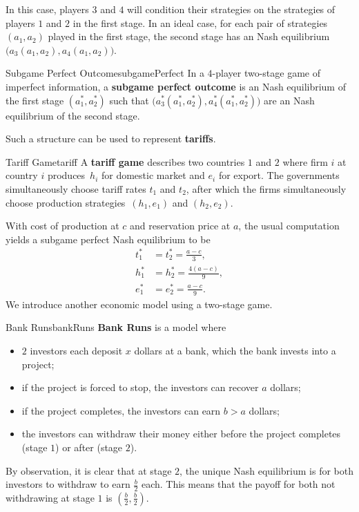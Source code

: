 \documentclass[math]{amznotes}
\theoremstyle{remark}
\begin{document}
In this case, players $3$ and $4$ will condition their strategies on the strategies of players $1$ and $2$ in the first stage. In an ideal case, for each pair of strategies $\left(a_1, a_2\right)$ played in the first stage, the second stage has an Nash equilibrium $\bigl(a_3\left(a_1, a_2\right), a_4\left(a_1, a_2\right)\bigr)$.
\begin{dfnbox}{Subgame Perfect Outcome}{subgamePerfect}
    In a $4$-player two-stage game of imperfect information, a {\color{red} \textbf{subgame perfect outcome}} is an Nash equilibrium of the first stage $\left(a_1^*, a_2^*\right)$ such that $\bigl(a_3^*\left(a_1^*, a_2^*\right), a_4^*\left(a_1^*, a_2^*\right)\bigr)$ are an Nash equilibrium of the second stage.
\end{dfnbox}
Such a structure can be used to represent \textbf{tariffs}.
\begin{dfnbox}{Tariff Game}{tariff}
    A {\color{red} \textbf{tariff game}} describes two countries $1$ and $2$ where firm $i$ at country $i$ produces~$h_i$ for domestic market and $e_i$ for export. The governments simultaneously choose tariff rates $t_1$ and $t_2$, after which the firms simultaneously choose production strategies~$\left(h_1, e_1\right)$ and $\left(h_2, e_2\right)$.
\end{dfnbox}
With cost of production at $c$ and reservation price at $a$, the usual computation yields a subgame perfect Nash equilibrium to be 
\begin{align*}
    t_1^* & = t_2^* = \frac{a - c}{3}, \\
    h_1^* & = h_2^* = \frac{4\left(a - c\right)}{9}, \\
    e_1^* & = e_2^* = \frac{a - c}{9}.
\end{align*}
We introduce another economic model using a two-stage game.
\begin{dfnbox}{Bank Runs}{bankRuns}
    {\color{red} \textbf{Bank Runs}} is a model where
    \begin{itemize}
        \item $2$ investors each deposit $x$ dollars at a bank, which the bank invests into a project;
        \item if the project is forced to stop, the investors can recover $a$ dollars;
        \item if the project completes, the investors can earn $b > a$ dollars;
        \item the investors can withdraw their money either before the project completes (stage $1$) or after (stage $2$).
    \end{itemize}
\end{dfnbox}
By observation, it is clear that at stage $2$, the unique Nash equilibrium is for both investors to withdraw to earn $\frac{b}{2}$ each. This means that the payoff for both not withdrawing at stage $1$ is $\left(\frac{b}{2}, \frac{b}{2}\right)$. 
\end{document}
